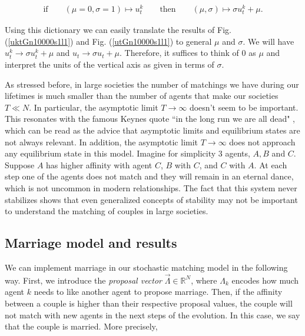 \documentclass[12pt]{article}
\begin{document}
\begin{align}
    \textrm{if}\qquad(\mu=0,\sigma=1)\mapsto u_t^k\qquad\textrm{then}\qquad (\mu,\sigma)\mapsto \sigma u_t^k+\mu.
    \label{generalmusigma}
\end{align}

\noindent Using this dictionary we can easily translate the results of Fig. (\ref{uktGn10000s1l1}) and Fig. (\ref{utGn10000s1l1}) to general $\mu$ and $\sigma$. We will have $u_t^k\rightarrow \sigma u_t^k+\mu$ and $u_t\rightarrow \sigma u_t+\mu$. Therefore, it suffices to think of $0$ as $\mu$ and interpret the units of the vertical axis as given in terms of $\sigma$.


As stressed before, in large societies the number of matchings we have during our lifetimes is much smaller than the number of agents that make our societies $T\ll N$. In particular, the asymptotic limit $T\rightarrow\infty$ doesn't seem to be important. This resonates with the famous Keynes quote ``in the long run we are all dead" \cite{keynes1923tract}, which can be read as the advice that asymptotic limits and equilibrium states are not always relevant. In addition, the asymptotic limit $T\rightarrow\infty$ does not approach any equilibrium state in this model. Imagine for simplicity 3 agents, $A,B$ and $C$. Suppose $A$ has higher affinity with agent $C$, $B$ with $C$, and $C$ with $A$. At each step one of the agents does not match and they will remain in an eternal dance, which is not uncommon in modern relationships. The fact that this system never stabilizes shows that even generalized concepts of stability \cite{Multi-period,doval2021dynamically,Credibility,DAMIANO200534} may not be important to understand the matching of couples in large societies.


\subsection{Marriage model and results}
\label{benefitsofmarriage}

We can implement marriage in our stochastic matching model in the following way. First, we introduce the \textit{proposal vector} $\vec{\Lambda}\in\mathbb{R}^N$, where $\Lambda_k$ encodes how much agent $k$ needs to like another agent to propose marriage. Then, if the affinity between a couple is higher than their respective proposal values, the couple will not match with new agents in the next steps of the evolution. In this case, we say that the couple is married. More precisely, 
\end{document}
